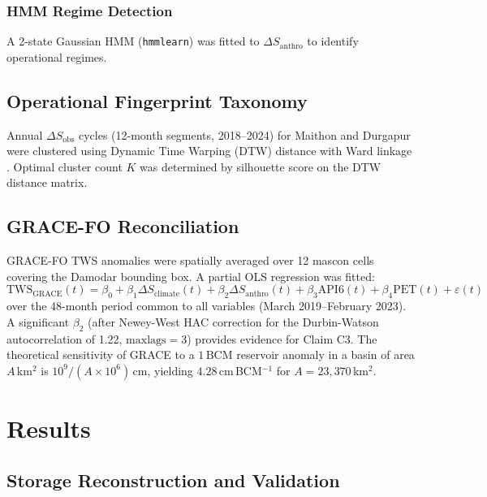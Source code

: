 \documentclass[preprint,12pt,authoryear]{elsarticle}
\newcommand{\dSobs}{\Delta S_{\mathrm{obs}}}
\newcommand{\dSclim}{\Delta S_{\mathrm{climate}}}
\newcommand{\dSanthro}{\Delta S_{\mathrm{anthro}}}
\newcommand{\BCM}{\,\mathrm{BCM}}
\begin{document}
\subsubsection{HMM Regime Detection}

A 2-state Gaussian HMM (\texttt{hmmlearn}) was fitted to $\dSanthro$ to
identify operational regimes.

\subsection{Operational Fingerprint Taxonomy}
\label{sec:methods_dtw}

Annual $\dSobs$ cycles (12-month segments, 2018--2024) for Maithon and
Durgapur were clustered using Dynamic Time Warping (DTW) distance
\citep{Sakoe1978} with Ward linkage \citep{dtaidistance}. Optimal cluster
count $K$ was determined by silhouette score on the DTW distance matrix.

\subsection{GRACE-FO Reconciliation}
\label{sec:methods_grace}

GRACE-FO TWS anomalies were spatially averaged over 12 mascon cells
covering the Damodar bounding box. A partial OLS regression was fitted:
\begin{equation}
  \mathrm{TWS}_{\mathrm{GRACE}}(t) =
    \beta_0 + \beta_1 \dSclim(t) + \beta_2 \dSanthro(t)
    + \beta_3 \mathrm{API6}(t) + \beta_4 \mathrm{PET}(t) + \varepsilon(t)
  \label{eq:grace}
\end{equation}
over the 48-month period common to all variables (March 2019--February 2023).
A significant $\beta_2$ (after Newey-West HAC correction for the
Durbin-Watson autocorrelation of 1.22, $\text{maxlags} = 3$) provides
evidence for Claim C3. The theoretical sensitivity of GRACE to a $1\BCM$
reservoir anomaly in a basin of area $A$\,km$^2$ is
$10^9 / (A \times 10^6)$\,cm, yielding $4.28$\,cm\,BCM$^{-1}$ for
$A = 23{,}370$\,km$^2$.

\section{Results}
\label{sec:results}

\subsection{Storage Reconstruction and Validation}
\label{sec:res_stage1}
\end{document}
